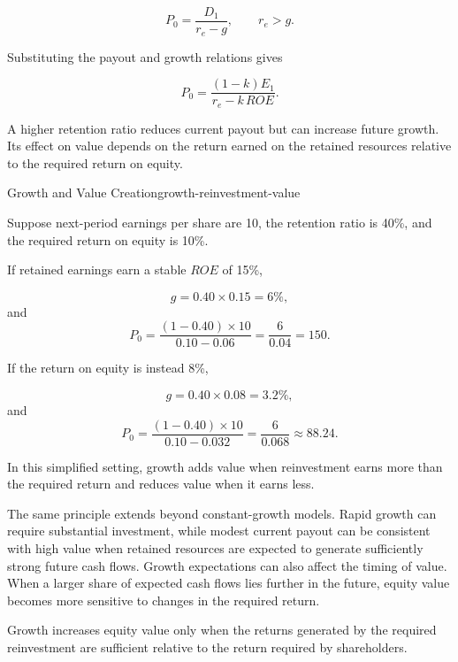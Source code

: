 \begin{equation}
P_0=\frac{D_1}{r_e-g},
\qquad
r_e>g.
\label{eq:ch9-gordon-growth}
\end{equation}

Substituting the payout and growth relations gives

\begin{equation}
P_0
=
\frac{(1-k)E_1}
{r_e-k\,ROE}.
\label{eq:ch9-growth-reinvestment-value}
\end{equation}

A higher retention ratio reduces current payout but can increase future growth. Its effect on value depends on the return earned on the retained resources relative to the required return on equity.

\begin{example}{Growth and Value Creation}{growth-reinvestment-value}

Suppose next-period earnings per share are 10, the retention ratio is 40\%, and the required return on equity is 10\%.

If retained earnings earn a stable \(ROE\) of 15\%,

\[
g=0.40\times 0.15=6\%,
\]
and
\[
P_0=\frac{(1-0.40)\times 10}{0.10-0.06}=\frac{6}{0.04}=150.
\]

If the return on equity is instead 8\%,

\[
g=0.40\times 0.08=3.2\%,
\]
and
\[
P_0=\frac{(1-0.40)\times 10}{0.10-0.032}=\frac{6}{0.068}\approx88.24.
\]

In this simplified setting, growth adds value when reinvestment earns more than the required return and reduces value when it earns less.

\end{example}

The same principle extends beyond constant-growth models. Rapid growth can require substantial investment, while modest current payout can be consistent with high value when retained resources are expected to generate sufficiently strong future cash flows. Growth expectations can also affect the timing of value. When a larger share of expected cash flows lies further in the future, equity value becomes more sensitive to changes in the required return.

\begin{tcolorbox}[
  enhanced,
  breakable,
  colback=white,
  colframe=FinanceBlue,
  boxrule=0.7pt,
  sharp corners,
  borderline west={2.2pt}{0pt}{FinanceBlue},
  title=\textbf{Financial Perspective: Growth Is Not the Same as Value Creation},
  coltitle=white,
  colbacktitle=FinanceBlue,
  fonttitle=\bfseries,
  before skip=1.2em,
  after skip=1.2em
]

Growth increases equity value only when the returns generated by the required reinvestment are sufficient relative to the return required by shareholders.

\end{tcolorbox}

